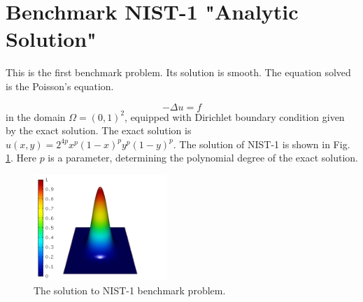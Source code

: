 \documentclass[12pt]{elsarticle}
\begin{document}

\section{Benchmark NIST-1 "Analytic Solution"}
\label{sec:bench-1}

This is the first benchmark problem. Its solution is smooth.
The equation solved is the Poisson's equation.

\begin{equation} \label{poisson}
-\Delta u = f
\end{equation}
in the domain $\Omega = (0, 1)^2$, equipped with Dirichlet
boundary condition given by the exact solution.
The exact solution is $u(x, y) = 2^{4p}x^{p}(1-x)^{p}y^{p}(1-y)^{p}$.
The solution of NIST-1 is shown in Fig. \ref{fig:sln-nist01}.
Here $p$ is a parameter, determining the polynomial degree of the exact solution.

\begin{figure}[H]
\centering
\vspace{-3mm}
\includegraphics[height=4cm]{nist/nist-1/solution.png}
\vspace{-3mm}
\caption{The solution to NIST-1 benchmark problem.}
\label{fig:sln-nist01}
\end{figure}
\end{document}

